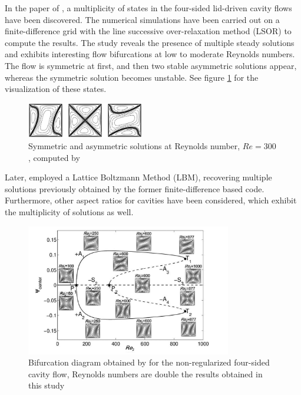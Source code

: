 In the paper of \cite{wahba2009}, a multiplicity of states in the four-sided
lid-driven cavity flows have been discovered. The numerical simulations have
been carried out on a finite-difference grid with the line successive
over-relaxation method (LSOR) to compute the results. The study reveals the
presence of multiple steady solutions and exhibits interesting flow
bifurcations at low to moderate Reynolds numbers. The flow is symmetric at
first, and then two stable asymmetric solutions appear, whereas the symmetric
solution becomes unstable. See figure \ref{fig:4fsc_states} for the
visualization of these states.

\begin{figure}[ht]
  \centering
  \includegraphics[width=0.455\textwidth]{figs/fig_wahba2009}
  \caption{Symmetric and asymmetric solutions at Reynolds number, $Re=300$, computed by
    \cite{wahba2009}}
  \label{fig:4fsc_states}
\end{figure}

Later, \cite{perumal2011} employed a Lattice Boltzmann Method (LBM), recovering
multiple solutions previously obtained by the former finite-difference based
code. Furthermore, other aspect ratios for cavities have been considered, which
exhibit the multiplicity of solutions as well. 

\begin{figure}[ht]
  \centering
  \includegraphics[width=0.8\textwidth]{figs/fig2_chen2013.png}
  \caption{Bifurcation diagram obtained by \cite{chen2013} for the
    non-regularized four-sided cavity flow, Reynolds numbers are 
    double the results obtained in this study} 
  \label{fig:bif_diag_chen}
\end{figure}

